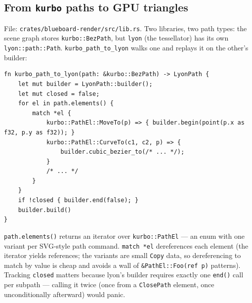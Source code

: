 \documentclass[11pt]{article}
\begin{document}
\subsection{From \texttt{kurbo} paths to GPU triangles}
File: \texttt{crates/blueboard-render/src/lib.rs}. Two libraries, two path types: the
scene graph stores \texttt{kurbo::BezPath}, but \texttt{lyon} (the tessellator) has its
own \texttt{lyon::path::Path}. \texttt{kurbo\_path\_to\_lyon} walks one and replays it on
the other's builder:
\begin{lstlisting}
fn kurbo_path_to_lyon(path: &kurbo::BezPath) -> LyonPath {
    let mut builder = LyonPath::builder();
    let mut closed = false;
    for el in path.elements() {
        match *el {
            kurbo::PathEl::MoveTo(p) => { builder.begin(point(p.x as f32, p.y as f32)); }
            kurbo::PathEl::CurveTo(c1, c2, p) => {
                builder.cubic_bezier_to(/* ... */);
            }
            /* ... */
        }
    }
    if !closed { builder.end(false); }
    builder.build()
}
\end{lstlisting}
\texttt{path.elements()} returns an iterator over \texttt{kurbo::PathEl} — an enum with
one variant per SVG-style path command. \texttt{match *el} dereferences each element (the
iterator yields references; the variants are small \texttt{Copy} data, so dereferencing to
match by value is cheap and avoids a wall of \texttt{\&PathEl::Foo(ref p)} patterns).
Tracking \texttt{closed} matters because lyon's builder requires exactly one
\texttt{end()} call per subpath — calling it twice (once from a \texttt{ClosePath}
element, once unconditionally afterward) would panic.
\end{document}
